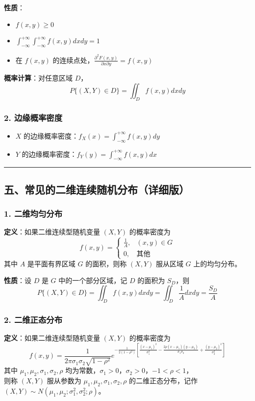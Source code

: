 \documentclass[12pt,a4paper]{ctexart}
\begin{document}
\textbf{性质}：
\begin{itemize}[noitemsep]
    \item $f(x, y) \ge 0$
    \item $\int_{-\infty}^{+\infty} \int_{-\infty}^{+\infty} f(x, y) dx dy = 1$
    \item 在 $f(x, y)$ 的连续点处，$\frac{\partial^2 F(x, y)}{\partial x \partial y} = f(x, y)$
\end{itemize}

\textbf{概率计算}：对任意区域 $D$，
\[ P\{(X, Y) \in D\} = \iint_D f(x, y) dx dy \]

\subsubsection{2. 边缘概率密度}
\begin{itemize}[noitemsep]
    \item $X$ 的边缘概率密度：$f_X(x) = \int_{-\infty}^{+\infty} f(x, y) dy$
    \item $Y$ 的边缘概率密度：$f_Y(y) = \int_{-\infty}^{+\infty} f(x, y) dx$
\end{itemize}

\vspace{1em}\hrule\vspace{1em}

\subsection{五、常见的二维连续随机分布（详细版）}

\subsubsection{1. 二维均匀分布}
\textbf{定义}：如果二维连续型随机变量 $(X, Y)$ 的概率密度为
\[ f(x, y) = \begin{cases} \frac{1}{A}, & (x, y) \in G \\ 0, & \text{其他} \end{cases} \]
其中 $A$ 是平面有界区域 $G$ 的面积，则称 $(X, Y)$ 服从区域 $G$ 上的均匀分布。

\textbf{性质}：设 $D$ 是 $G$ 中的一个部分区域，记 $D$ 的面积为 $S_D$，则
\[ P\{(X, Y) \in D\} = \iint_D f(x, y) dx dy = \iint_D \frac{1}{A} dx dy = \frac{S_D}{A} \]

\subsubsection{2. 二维正态分布}
\textbf{定义}：如果二维连续型随机变量 $(X, Y)$ 的概率密度为
\[ f(x, y) = \frac{1}{2\pi\sigma_1\sigma_2\sqrt{1-\rho^2}} e^{-\frac{1}{2(1-\rho^2)}\left[\frac{(x-\mu_1)^2}{\sigma_1^2} - \frac{2\rho(x-\mu_1)(y-\mu_2)}{\sigma_1\sigma_2} + \frac{(y-\mu_2)^2}{\sigma_2^2}\right]} \]
其中 $\mu_1, \mu_2, \sigma_1, \sigma_2, \rho$ 均为常数，$\sigma_1 > 0$，$\sigma_2 > 0$，$-1 < \rho < 1$，\\
则称 $(X, Y)$ 服从参数为 $\mu_1, \mu_2, \sigma_1, \sigma_2, \rho$ 的二维正态分布，记作 $(X, Y) \sim N(\mu_1, \mu_2; \sigma_1^2, \sigma_2^2; \rho)$。
\end{document}
